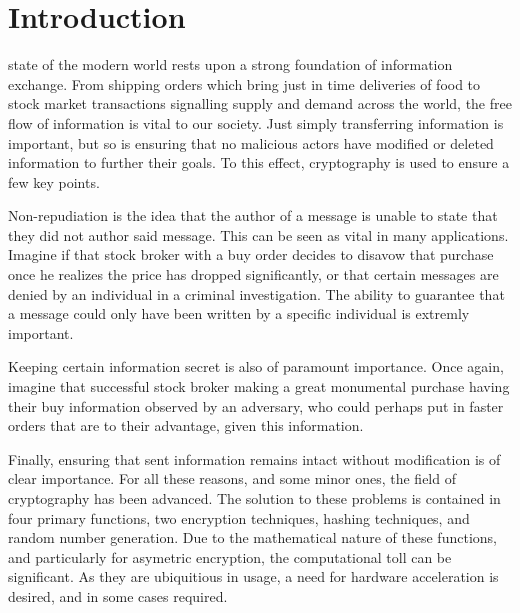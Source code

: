 \documentclass[journal]{IEEEtran}
\begin{document}
\section{Introduction}
% 
% 
% 
% 
 state of the modern world rests upon a strong foundation of information exchange.  From shipping orders which bring just in time deliveries of food to stock market transactions signalling supply and demand across the world, the free flow of information is vital to our society.  Just simply transferring information is important, but so is ensuring that no malicious actors have modified or deleted information to further their goals.  To this effect, cryptography is used to ensure a few key points.  

Non-repudiation is the idea that the author of a message is unable to state that they did not author said message.  This can be seen as vital in many applications.  Imagine if that stock broker with a buy order decides to disavow that purchase once he realizes the price has dropped significantly, or that certain messages are denied by an individual in a criminal investigation.  The ability to guarantee that a message could only have been written by a specific individual is extremly important.

Keeping certain information secret is also of paramount importance.  Once again, imagine that successful stock broker making a great monumental purchase having their buy information observed by an adversary, who could perhaps put in faster orders that are to their advantage, given this information.  

Finally, ensuring that sent information remains intact without modification is of clear importance.  For all these reasons, and some minor ones, the field of cryptography has been advanced.  The solution to these problems is contained in four primary functions, two encryption techniques, hashing techniques, and random number generation.  Due to the mathematical nature of these functions, and particularly for asymetric encryption, the computational toll can be significant.  As they are ubiquitious in usage, a need for hardware acceleration is desired, and in some cases required.
\end{document}
